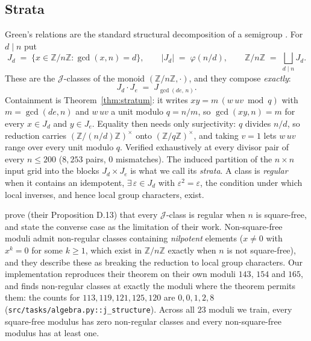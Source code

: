 \subsection{Strata}
\label{sec:setup-strata}

\begin{definition}
\label{def:jclass}
Green's relations are the standard structural decomposition of a semigroup
\citep{howie1995semigroups}. For $d \mid n$ put
\begin{equation}
  \label{eq:jclass}
  J_{d} \;=\; \{x \in \mathbb{Z}/n\mathbb{Z} : \gcd(x, n) = d\},
  \qquad
  |J_{d}| \;=\; \varphi(n/d),
  \qquad
  \mathbb{Z}/n\mathbb{Z} \;=\; \bigsqcup_{d \mid n} J_{d} .
\end{equation}
These are the $\mathcal{J}$-classes of the monoid $(\mathbb{Z}/n\mathbb{Z}, \cdot)$, and they
compose \emph{exactly}:
\begin{equation}
  \label{eq:jcompose}
  J_{d} \cdot J_{e} \;=\; J_{\gcd(de,\, n)} .
\end{equation}
Containment is Theorem~\ref{thm:stratum}: it writes $xy = m\,(w\,uv \bmod q)$ with
$m = \gcd(de,n)$ and $w\,uv$ a unit modulo $q = n/m$, so $\gcd(xy, n) = m$ for every
$x \in J_{d}$ and $y \in J_{e}$. Equality then needs only surjectivity: $q$ divides $n/d$,
so reduction carries $(\mathbb{Z}/(n/d)\mathbb{Z})^{\times}$ onto
$(\mathbb{Z}/q\mathbb{Z})^{\times}$, and taking $v = 1$ lets $w\,uv$ range over every unit
modulo $q$. Verified exhaustively at every divisor pair of every $n \le 200$
($8{,}253$ pairs, $0$ mismatches).
The induced partition of the $n \times n$ input grid into the blocks
$J_{d} \times J_{e}$ is what we call its \emph{strata}. A class is \emph{regular} when it
contains an idempotent, $\exists\, \varepsilon \in J_{d}$ with $\varepsilon^{2} = \varepsilon$,
the condition under which local inverses, and hence local group characters, exist.
\end{definition}

\citet{chen2026multiplication}
prove (their Proposition D.13) that every $\mathcal{J}$-class is regular when $n$ is square-free,
and state the converse case as the limitation of their work. Non-square-free moduli admit
non-regular classes containing \emph{nilpotent} elements ($x \neq 0$ with $x^{k} = 0$ for some
$k \ge 1$, which exist in $\mathbb{Z}/n\mathbb{Z}$ exactly when $n$ is not square-free), and
they describe these as breaking the reduction to local group characters. Our implementation reproduces their theorem on their own
moduli $143$, $154$ and $165$, and finds non-regular classes at exactly the moduli where the
theorem permits them: the counts for $113, 119, 121, 125, 120$ are $0, 0, 1, 2, 8$
(\texttt{src/tasks/algebra.py::j\_structure}). Across all $23$ moduli we train, every
square-free modulus has zero non-regular classes and every non-square-free modulus has at
least one.

